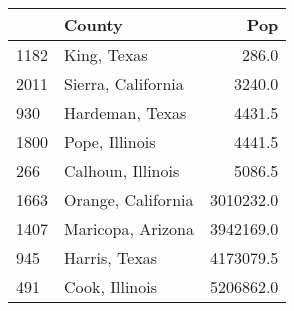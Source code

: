 \begin{tabular}{llr}
\toprule
{} &              County &        Pop \\
\midrule
1182 &         King, Texas &      286.0 \\
2011 &  Sierra, California &     3240.0 \\
930  &     Hardeman, Texas &     4431.5 \\
1800 &      Pope, Illinois &     4441.5 \\
266  &   Calhoun, Illinois &     5086.5 \\
1663 &  Orange, California &  3010232.0 \\
1407 &   Maricopa, Arizona &  3942169.0 \\
945  &       Harris, Texas &  4173079.5 \\
491  &      Cook, Illinois &  5206862.0 \\
\bottomrule
\end{tabular}
